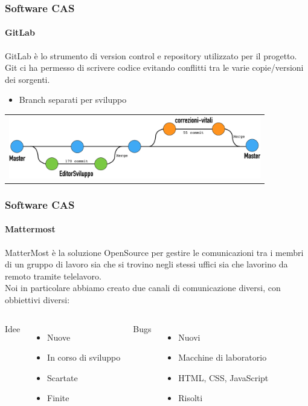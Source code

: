 \documentclass{beamer}
\begin{document}
\begin{frame}
\frametitle{Software CAS}
\framesubtitle{GitLab}
GitLab è lo strumento di version control e repository utilizzato per il progetto.\\
Git ci ha permesso di scrivere codice evitando conflitti tra le varie copie/versioni dei sorgenti.
  \begin{itemize}
	\item Branch separati per sviluppo
  \end{itemize}
      \centering
        \begin{tabular}{c}
        \includegraphics[width=11cm]{Images/GitLab/branches2}
      \end{tabular}
\end{frame}

\begin{frame}
\frametitle{Software CAS}
\framesubtitle{Mattermost}
MatterMost è la soluzione OpenSource per gestire le comunicazioni tra i membri di un gruppo di lavoro sia che si trovino negli stessi uffici sia che lavorino da remoto tramite telelavoro.\\
\vspace{0.2cm}
Noi in particolare abbiamo creato due canali di comunicazione diversi, con obbiettivi diversi:
\vspace{0.2cm}
\begin{columns}
\centering
Idee
  \begin{itemize}
	\item Nuove
	\item In corso di sviluppo
	\item Scartate
	\item Finite
  \end{itemize}
\centering
Bugs
  \begin{itemize}
	\item Nuovi
	\item Macchine di laboratorio
	\item HTML, CSS, JavaScript
	\item Risolti
  \end{itemize}
\end{columns}
\end{frame}
\end{document}
